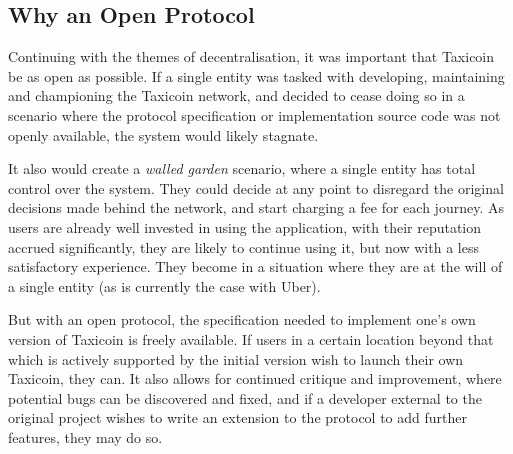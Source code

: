 \subsection{Why an Open Protocol}

Continuing with the themes of decentralisation, it was important that Taxicoin be as open as possible. If a single entity was tasked with developing, maintaining and championing the Taxicoin network, and decided to cease doing so in a scenario where the protocol specification or implementation source code was not openly available, the system would likely stagnate.

It also would create a \textit{walled garden} scenario, where a single entity has total control over the system. They could decide at any point to disregard the original decisions made behind the network, and start charging a fee for each journey. As users are already well invested in using the application, with their reputation accrued significantly, they are likely to continue using it, but now with a less satisfactory experience. They become in a situation where they are at the will of a single entity (as is currently the case with Uber).

But with an open protocol, the specification needed to implement one's own version of Taxicoin is freely available. If users in a certain location beyond that which is actively supported by the initial version wish to launch their own Taxicoin, they can. It also allows for continued critique and improvement, where potential bugs can be discovered and fixed, and if a developer external to the original project wishes to write an extension to the protocol to add further features, they may do so.
